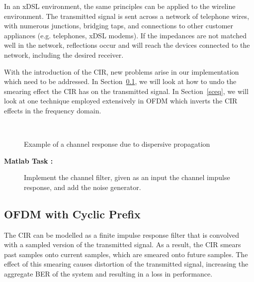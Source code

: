 \documentclass[12pt]{article}
\newcommand{\goodgap}{%
\hspace{\subfigtopskip}%
\hspace{\subfigbottomskip}}
\newcounter{matlabcnt}
\begin{document}
In an xDSL environment, the same principles can be applied to the
wireline environment. The transmitted signal is sent across a
network of telephone wires, with numerous junctions, bridging
taps, and connections to other customer appliances (e.g.
telephones, xDSL modems). If the impedances are not matched well
in the network, reflections occur and will reach the devices
connected to the network, including the desired receiver.

With the introduction of the CIR, new problems arise in our
implementation which need to be addressed. In
Section~\ref{ofdmcp}, we will look at how to undo the smearing
effect the CIR has on the transmitted signal. In
Section~\ref{sceq}, we will look at one technique employed
extensively in OFDM which inverts the CIR effects in the frequency
domain.

\begin{figure}[h]
\begin{center}
\goodgap
{}\\
\caption{Example of a channel response due to dispersive
propagation}
\end{center}
\end{figure}

\begin{description}
    \item[{\bf Matlab Task :}]
    Implement the channel filter, given as an input the channel
    impulse response, and add the noise generator.
\end{description}



\subsection{OFDM with Cyclic Prefix}\label{ofdmcp}

The CIR can be modelled as a finite impulse response filter that
is convolved with a sampled version of the transmitted signal. As
a result, the CIR smears past samples onto current samples, which
are smeared onto future samples. The effect of this smearing
causes distortion of the transmitted signal, increasing the
aggregate BER of the system and resulting in a loss in
performance.
\end{document}
